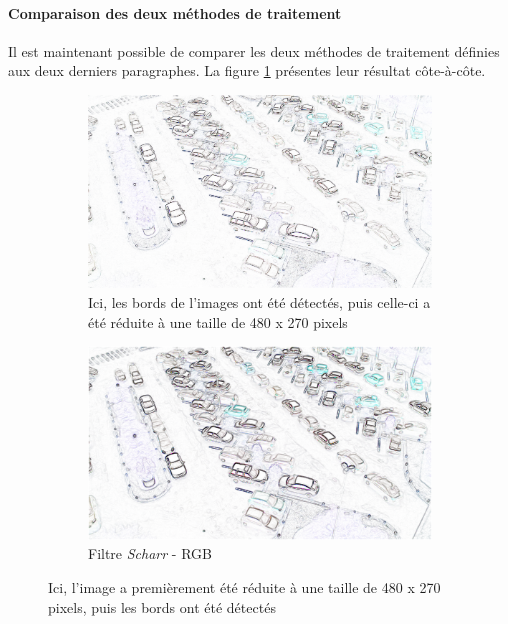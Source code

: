 \paragraph{Comparaison des deux méthodes de traitement}

Il est maintenant possible de comparer les deux méthodes de traitement définies aux deux derniers paragraphes. La figure \ref{fig:image_process_compare} présentes leur résultat côte-à-côte.

\begin{figure}[H]
    \begin{subfigure}{\textwidth}
        \centering
        \includegraphics[width=.8\linewidth]{img/conception/image_process/edge-downsample/2.png}
        \caption{Ici, les bords de l'images ont été détectés, puis celle-ci a été réduite à une taille de 480 x 270 pixels}
    \end{subfigure}%

    \bigskip
    \begin{subfigure}{\textwidth}
        \centering
        \includegraphics[width=.8\linewidth]{img/conception/image_process/downsample-edge/4.png}
        \caption{Filtre \textit{Scharr} - RGB}
    \end{subfigure}%
    \centering
    \caption{Ici, l'image a premièrement été réduite à une taille de 480 x 270 pixels, puis les bords ont été détectés}
    \label{fig:image_process_compare}
\end{figure}

